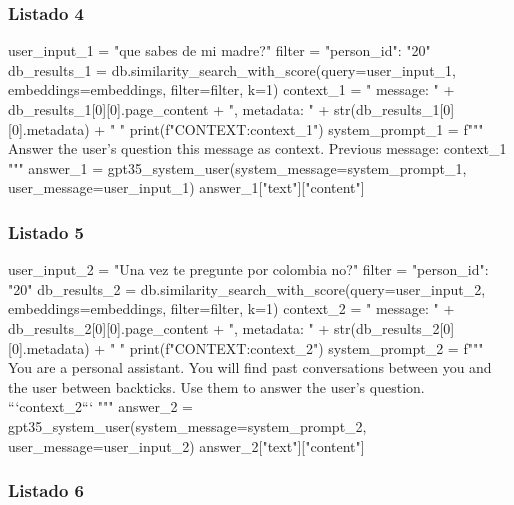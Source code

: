 \subsubsection{Listado 4}
\label{anexo:code-4-1-7-4}

\begin{APACode}
user_input_1 = "que sabes de mi madre?" 
filter = {"person_id": "20"}
db_results_1 = db.similarity_search_with_score(query=user_input_1, 
                                               embeddings=embeddings, 
                                               filter=filter, k=1) 
context_1 = "{ message: " + db_results_1[0][0].page_content + 
            ", metadata: " + str(db_results_1[0][0].metadata) + " }" 
print(f"CONTEXT:{context_1}")
system_prompt_1 = f"""
Answer the user's question this message as context. 
Previous message: {context_1}
"""
answer_1 = gpt35_system_user(system_message=system_prompt_1, 
                             user_message=user_input_1) 
answer_1["text"]["content"]
\end{APACode}

\subsubsection{Listado 5}
\label{anexo:code-4-1-7-5}

\begin{APACode}
user_input_2 = "Una vez te pregunte por colombia no?" 
filter = {"person_id": "20"}
db_results_2 = db.similarity_search_with_score(query=user_input_2, 
                                               embeddings=embeddings, 
                                               filter=filter, k=1) 
context_2 = "{ message: " + db_results_2[0][0].page_content + 
            ", metadata: " + str(db_results_2[0][0].metadata) + " }" 
print(f"CONTEXT:{context_2}")
system_prompt_2 = f"""
You are a personal assistant. You will find past conversations between 
you and the user between backticks. Use them to answer the user's question.
```{context_2}``` 
"""
answer_2 = gpt35_system_user(system_message=system_prompt_2, 
                             user_message=user_input_2) 
answer_2["text"]["content"]
\end{APACode}

\subsubsection{Listado 6}
\label{anexo:code-4-1-7-6}


